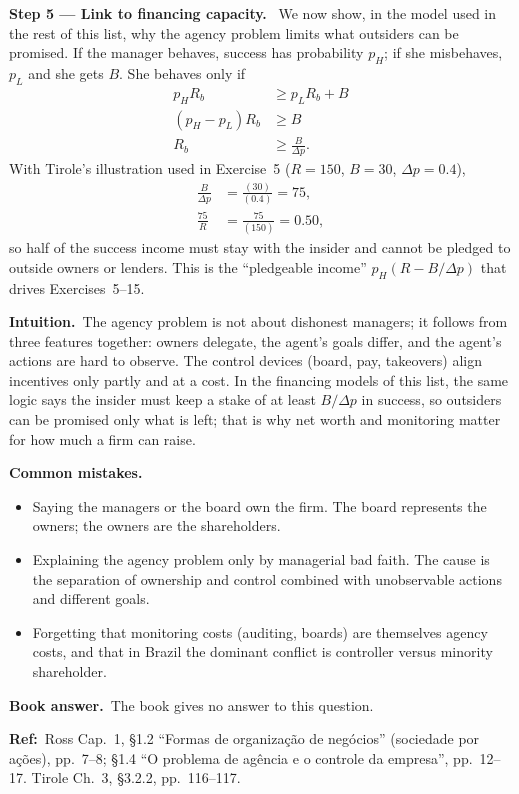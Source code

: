 \documentclass[11pt,a4paper]{article}
\newcommand{\step}[2]{\par\medskip\noindent\textbf{Step #1 --- #2.}~}
\newcommand{\intuition}{\par\medskip\noindent\textbf{Intuition.}~}
\newcommand{\bookans}{\par\medskip\noindent\textbf{Book answer.}~}
\newcommand{\refbib}{\par\smallskip\noindent\textbf{Ref:}~}
\newcommand{\pitfalls}{\par\medskip\noindent\textbf{Common mistakes.}}
\begin{document}
\step{5}{Link to financing capacity} We now show, in the model used in the rest of this list,
why the agency problem limits what outsiders can be promised. If the manager behaves, success
has probability $p_H$; if she misbehaves, $p_L$ and she gets $B$. She behaves only if
\begin{align}
  p_H R_b &\ge p_L R_b+B \nonumber\\
  (p_H-p_L)R_b &\ge B \nonumber\\
  R_b &\ge \frac{B}{\Delta p}. \label{r4e1-IC}
\end{align}
With Tirole's illustration used in Exercise~5 ($R=150$, $B=30$, $\Delta p=0.4$),
\begin{align}
  \frac{B}{\Delta p} &= \frac{(30)}{(0.4)} = 75, \nonumber\\
  \frac{75}{R} &= \frac{75}{(150)} = 0.50, \nonumber
\end{align}
so half of the success income must stay with the insider and cannot be pledged to outside
owners or lenders. This is the ``pledgeable income'' $p_H(R-B/\Delta p)$ that drives
Exercises~5--15.

\intuition The agency problem is not about dishonest managers; it follows from three features
together: owners delegate, the agent's goals differ, and the agent's actions are hard to
observe. The control devices (board, pay, takeovers) align incentives only partly and at a
cost. In the financing models of this list, the same logic says the insider must keep a stake
of at least $B/\Delta p$ in success, so outsiders can be promised only what is left; that is
why net worth and monitoring matter for how much a firm can raise.
\pitfalls
\begin{itemize}
  \item Saying the managers or the board own the firm. The board represents the owners; the
        owners are the shareholders.
  \item Explaining the agency problem only by managerial bad faith. The cause is the
        separation of ownership and control combined with unobservable actions and different goals.
  \item Forgetting that monitoring costs (auditing, boards) are themselves agency costs, and
        that in Brazil the dominant conflict is controller versus minority shareholder.
\end{itemize}
\bookans The book gives no answer to this question.
\refbib{Ross Cap.~1, \S1.2 ``Formas de organiza\c{c}\~ao de neg\'ocios'' (sociedade por a\c{c}\~oes), pp.~7--8; \S1.4 ``O problema de ag\^encia e o controle da empresa'', pp.~12--17. Tirole Ch.~3, \S3.2.2, pp.~116--117.}
\end{document}

